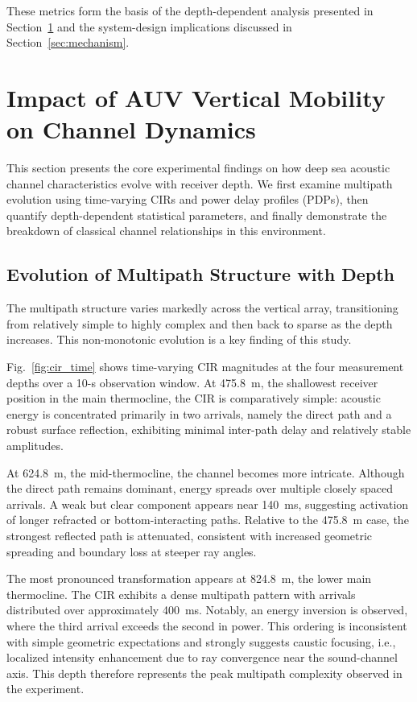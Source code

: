 \documentclass[lettersize,journal]{IEEEtran}
\begin{document}
These metrics form the basis of the depth-dependent analysis presented in Section~\ref{sec:results} and the system-design implications discussed in Section~\ref{sec:mechanism}.


\section{Impact of AUV Vertical Mobility on Channel Dynamics}
\label{sec:results}

This section presents the core experimental findings on how deep sea acoustic channel characteristics evolve with receiver depth. We first examine multipath evolution using time-varying CIRs and power delay profiles (PDPs), then quantify depth-dependent statistical parameters, and finally demonstrate the breakdown of classical channel relationships in this environment.

\subsection{Evolution of Multipath Structure with Depth}
\label{subsec:multipath}

The multipath structure varies markedly across the vertical array, transitioning from relatively simple to highly complex and then back to sparse as the depth increases. This non-monotonic evolution is a key finding of this study.

Fig.~\ref{fig:cir_time} shows time-varying CIR magnitudes at the four measurement depths over a 10-s observation window. At 475.8~m, the shallowest receiver position in the main thermocline, the CIR is comparatively simple: acoustic energy is concentrated primarily in two arrivals, namely the direct path and a robust surface reflection, exhibiting minimal inter-path delay and relatively stable amplitudes.

At 624.8~m, the mid-thermocline, the channel becomes more intricate. Although the direct path remains dominant, energy spreads over multiple closely spaced arrivals. A weak but clear component appears near 140~ms, suggesting activation of longer refracted or bottom-interacting paths. Relative to the 475.8~m case, the strongest reflected path is attenuated, consistent with increased geometric spreading and boundary loss at steeper ray angles.

The most pronounced transformation appears at 824.8~m, the lower main thermocline. The CIR exhibits a dense multipath pattern with arrivals distributed over approximately 400~ms. Notably, an energy inversion is observed, where the third arrival exceeds the second in power. This ordering is inconsistent with simple geometric expectations and strongly suggests caustic focusing\cite{ref19}, i.e., localized intensity enhancement due to ray convergence near the sound-channel axis. This depth therefore represents the peak multipath complexity observed in the experiment.
\end{document}
